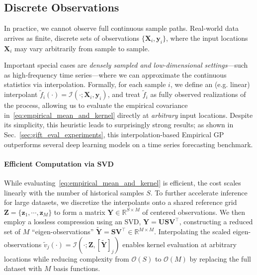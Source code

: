 \documentclass{article}
\newcommand{\K}{S}
\begin{document}

\subsection{Discrete Observations}
\label{sec:discrete_observations}
In practice, we cannot observe full continuous sample paths. Real-world data arrives as finite, discrete sets of observations $\{\mathbf{X}_i, \mathbf{y}_i\}$, where the input locations $\mathbf{X}_i$ may vary arbitrarily from sample to sample.

Important special cases are \textit{densely sampled and low-dimensional settings}—such as high-frequency time series—where we can approximate the continuous statistics via interpolation. Formally, for each sample $i$, we define an (e.g. linear) interpolant $\tilde{f}_i(\cdot) = \mathcal{I}(\cdot; \mathbf{X}_i, \mathbf{y}_i)$, and
treat $\tilde{f}_i$ as fully observed realizations of the process, allowing us to evaluate the empirical covariance in~\eqref{eq:empirical_mean_and_kernel} directly at \textit{arbitrary} input locations.
Despite its simplicity, this heuristic leads to surprisingly strong results; as shown in Sec.~\ref{sec:gift_eval_experiments}, this interpolation-based Empirical GP outperforms several deep learning models on a time series forecasting benchmark.

\paragraph{Efficient Computation via SVD}
While evaluating~\eqref{eq:empirical_mean_and_kernel} is efficient, the cost scales linearly with the number of historical samples $\K$. To further accelerate inference for large datasets, we discretize the interpolants onto a shared reference grid
$\mathbf{Z} = \{\mathbf{z}_1, \cdots, \mathbf{z}_M\}$
to form a matrix $\mathbf{Y} \in \mathbb{R}^{\K \times M}$ of centered observations. We then employ a lossless compression using an SVD,
$\mathbf{Y} = \mathbf{U} \mathbf{S} \mathbf{V}^\top$,
constructing a reduced set of $M$ ``eigen-observations'' $\tilde{\mathbf{Y}} = \mathbf{S}\mathbf{V}^\top \in \mathbb{R}^{M \times M}$.
Interpolating the scaled eigen-observations $\tilde{v}_j(\cdot) = \mathcal{I}(\cdot; \mathbf{Z}, [\tilde{\mathbf{Y}}]_j)$ enables kernel evaluation at arbitrary locations while reducing complexity from $\mathcal{O}(\K)$ to $\mathcal{O}(M)$ by replacing the full dataset with $M$ basis functions.
\end{document}

